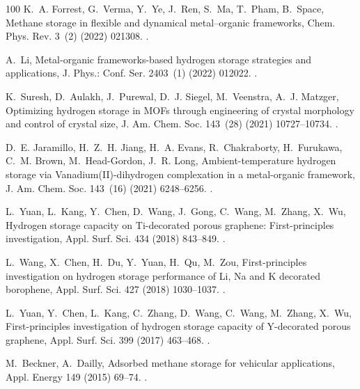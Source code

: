 \documentclass[review]{elsarticle}
\begin{document}
\begin{thebibliography}{100}
K.~A. Forrest, G.~Verma, Y.~Ye, J.~Ren, S.~Ma, T.~Pham, B.~Space, Methane
  storage in flexible and dynamical metal–organic frameworks, Chem. Phys.
  Rev. 3~(2) (2022) 021308.
\newblock \href {https://doi.org/10.1063/5.0072805}
  {}.

A.~Li, Metal-organic frameworks-based hydrogen storage strategies and
  applications, J. Phys.: Conf. Ser. 2403~(1) (2022) 012022.
\newblock \href {https://doi.org/10.1088/1742-6596/2403/1/012022}
  {}.

K.~Suresh, D.~Aulakh, J.~Purewal, D.~J. Siegel, M.~Veenstra, A.~J. Matzger,
  Optimizing hydrogen storage in {MOFs} through engineering of crystal
  morphology and control of crystal size, J. Am. Chem. Soc. 143~(28) (2021)
  10727--10734.
\newblock \href {https://doi.org/10.1021/jacs.1c04926}
  {}.

D.~E. Jaramillo, H.~Z.~H. Jiang, H.~A. Evans, R.~Chakraborty, H.~Furukawa,
  C.~M. Brown, M.~Head-Gordon, J.~R. Long, Ambient-temperature hydrogen storage
  via {Vanadium({II})}-dihydrogen complexation in a metal-organic framework, J.
  Am. Chem. Soc. 143~(16) (2021) 6248--6256.
\newblock \href {https://doi.org/10.1021/jacs.1c01883}
  {}.

L.~Yuan, L.~Kang, Y.~Chen, D.~Wang, J.~Gong, C.~Wang, M.~Zhang, X.~Wu, Hydrogen
  storage capacity on {Ti}-decorated porous graphene: First-principles
  investigation, Appl. Surf. Sci. 434 (2018) 843--849.
\newblock \href {https://doi.org/10.1016/j.apsusc.2017.10.231}
  {}.

L.~Wang, X.~Chen, H.~Du, Y.~Yuan, H.~Qu, M.~Zou, First-principles investigation
  on hydrogen storage performance of {Li}, {Na} and {K} decorated borophene,
  Appl. Surf. Sci. 427 (2018) 1030--1037.
\newblock \href {https://doi.org/10.1016/j.apsusc.2017.08.126}
  {}.

L.~Yuan, Y.~Chen, L.~Kang, C.~Zhang, D.~Wang, C.~Wang, M.~Zhang, X.~Wu,
  First-principles investigation of hydrogen storage capacity of {Y}-decorated
  porous graphene, Appl. Surf. Sci. 399 (2017) 463--468.
\newblock \href {https://doi.org/10.1016/j.apsusc.2016.12.054}
  {}.

M.~Beckner, A.~Dailly, Adsorbed methane storage for vehicular applications,
  Appl. Energy 149 (2015) 69--74.
\newblock \href {https://doi.org/10.1016/j.apenergy.2015.03.123}
  {}.


\end{thebibliography}
\end{document}
